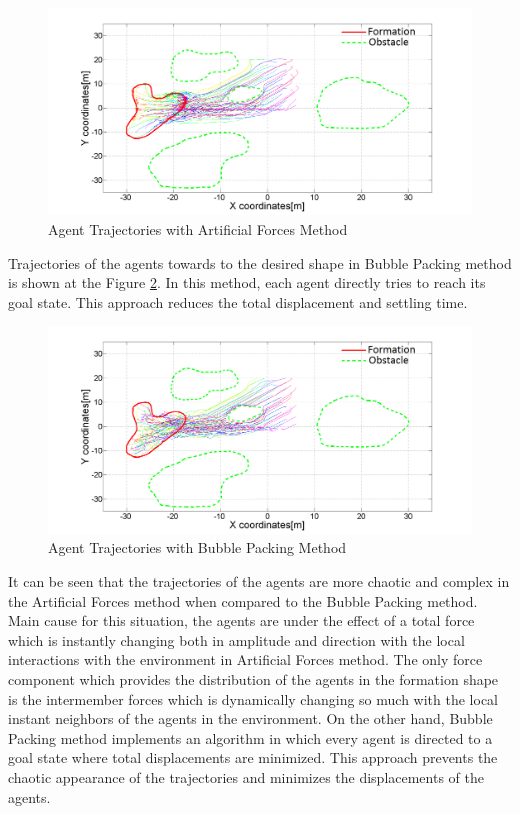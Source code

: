 \documentclass[letterpaper, 10 pt, conference]{ieeeconf}  %
\begin{document}
\begin{figure}[thpb]
\caption{Agent Trajectories with Artificial Forces Method} \label{arto1}
\centerline{\includegraphics[scale = 0.17]{Aritificial_Trajecories_1}}
\end{figure} 	
 
 Trajectories of the agents towards to the desired shape in Bubble Packing method is shown at the Figure \ref{bubble1}. In this method, each agent directly tries to reach its goal state. This approach reduces the total displacement and settling time.

\begin{figure}[thpb]
\caption{Agent Trajectories with Bubble Packing Method}
\centerline{\includegraphics[scale = 0.17]{Bubble_Trajectories_1}} \label{bubble1}
\end{figure}
			
It can be seen that the trajectories of the agents are more chaotic and complex in the Artificial Forces method when compared to the Bubble Packing method. Main cause for this situation, the agents are under the effect of a total force which is instantly changing both in amplitude and direction with the local interactions with the environment in Artificial Forces method. The only force component which provides the distribution of the agents in the formation shape is the intermember forces which is dynamically changing so much with the local instant neighbors of the agents in the environment. On the other hand, Bubble Packing method implements an algorithm in which every agent is directed to a goal state where total displacements are minimized. This approach prevents the chaotic appearance of the trajectories and minimizes the displacements of the agents.
\end{document}
